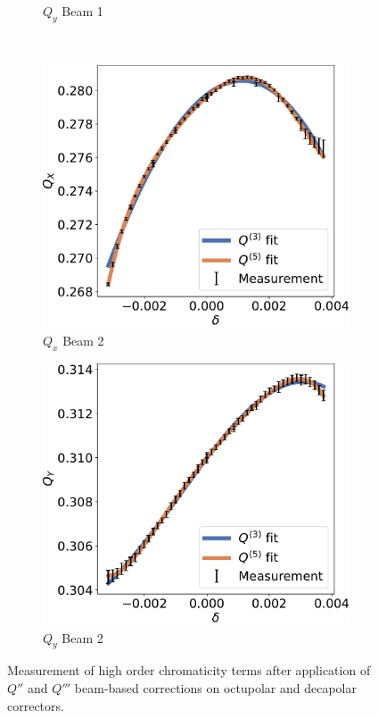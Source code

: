 \begin{figure}[!htb]
\begin{subfigure}{0.49\textwidth}
        \caption{$Q_y$ Beam 1}
        \label{}
    \end{subfigure}
    \\
    \begin{subfigure}{0.49\textwidth}
        \centering
        \includegraphics[width=\textwidth]{./images/higher_orders/bb_corrections_chroma/Beam2_Qx.pdf}
        \caption{$Q_x$ Beam 2}
        \label{}
    \end{subfigure}
    \hfill
    \begin{subfigure}{0.49\textwidth}
        \centering
        \includegraphics[width=\textwidth]{./images/higher_orders/bb_corrections_chroma/Beam2_Qy.pdf}
        \caption{$Q_y$ Beam 2}
        \label{}
    \end{subfigure}
    \caption{Measurement of high order chromaticity terms after application of $Q''$ and $Q'''$ 
    beam-based corrections on octupolar and decapolar correctors.}
    \label{fig:high_orders:chroma_after_correction}
\end{figure}


